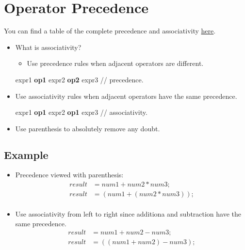 \section{Operator Precedence}
You can find a table of the complete precedence and associativity \href{https://en.cppreference.com/w/cpp/language/operator_precedence}{here}.

\begin{itemize}
    \item What is associativity?
        \begin{itemize}
            \item Use precedence rules when adjacent operators are different.
        \end{itemize}
        \begin{center}
           expr1 \textbf{op1} expr2 \textbf{op2} expr3 // precedence.
        \end{center}
    
    \item Use associativity rules when adjacent operators have the same precedence.
        \begin{center}
           expr1 \textbf{op1} expr2 \textbf{op1} expr3 // associativity.
        \end{center}
    
    \item Use parenthesis to absolutely remove any doubt.
\end{itemize}

\subsection{Example}
\begin{itemize}
    \item Precedence viewed with parenthesis: 
        \begin{align*}
            result &= num1 + num2 * num3; \\ 
            result &= (num1 + (num2 * num3)); \\ 
        \end{align*}
    
    \item Use associativity from left to right since additiona and subtraction have the same precedence.
        \begin{align*}
            result &= num1 + num2 - num3; \\ 
            result &= ((num1 + num2) - num3); \\ 
        \end{align*}
\end{itemize}
